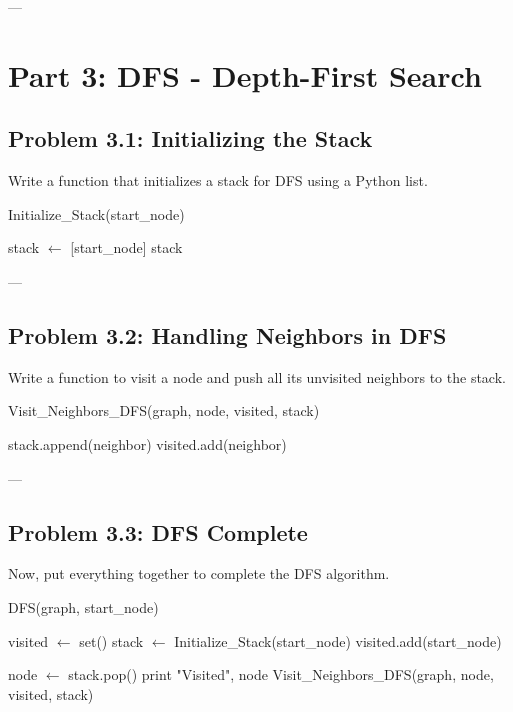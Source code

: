 \documentclass{article}
\begin{document}
---

\section*{Part 3: DFS - Depth-First Search}

\subsection*{Problem 3.1: Initializing the Stack}

Write a function that initializes a stack for DFS using a Python list.

\begin{algorithm}[H]
\caption{Initialize\_Stack(start\_node)}
\begin{algorithmic}
    \STATE stack $\gets$ [start\_node] 
    \RETURN stack
\end{algorithmic}
\end{algorithm}

---

\subsection*{Problem 3.2: Handling Neighbors in DFS}

Write a function to visit a node and push all its unvisited neighbors to the stack.

\begin{algorithm}[H]
\caption{Visit\_Neighbors\_DFS(graph, node, visited, stack)}
\begin{algorithmic}
            \STATE stack.append(neighbor) 
            \STATE visited.add(neighbor)
        \ENDIF
    \ENDFOR
\end{algorithmic}
\end{algorithm}

---

\subsection*{Problem 3.3: DFS Complete}

Now, put everything together to complete the DFS algorithm.

\begin{algorithm}[H]
\caption{DFS(graph, start\_node)}
\begin{algorithmic}
    \STATE visited $\gets$ set() 
    \STATE stack $\gets$ Initialize\_Stack(start\_node)
    \STATE visited.add(start\_node)

        \STATE node $\gets$ stack.pop() 
        \STATE print "Visited", node
        \STATE Visit\_Neighbors\_DFS(graph, node, visited, stack)
    \ENDWHILE
\end{algorithmic}
\end{algorithm}
\end{document}

